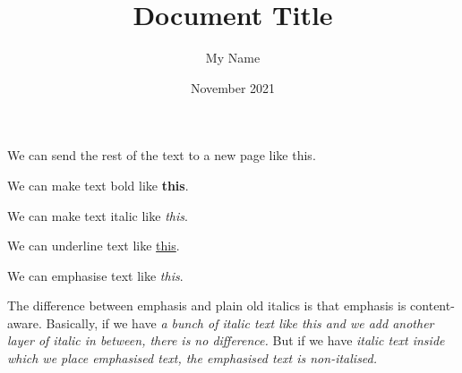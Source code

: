 \documentclass{article}
\title{Document Title}
\author{My Name}
\date{November 2021}
\begin{document}
\maketitle

We can send the rest of the text to a new page like this.

\newpage

We can make text bold like \textbf{this}.

We can make text italic like \textit{this}.

We can underline text like \underline{this}.

We can emphasise text like \emph{this}.

The difference between emphasis and plain old italics is that emphasis is content-aware. Basically, if we have \textit{a bunch of italic text like this and we add \textit{another layer of italic} in between, there is no difference.} But if we have \textit{italic text inside which we place \emph{emphasised text}, the emphasised text is non-italised.}
\end{document}
